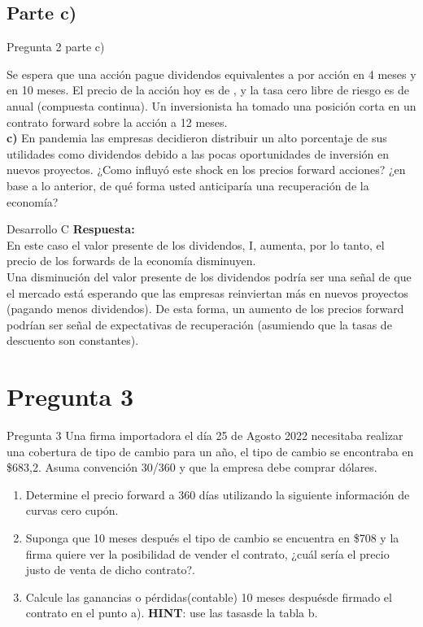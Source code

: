 \documentclass{beamer}
\begin{document}
\subsection{Parte c)}
\begin{frame}{Pregunta 2 parte c)}
  \justify

  Se espera que una acción pague dividendos equivalentes a \dinero{\dividendos} por acción en 4 meses y en 10 meses.
  El precio de la acción hoy es de \dinero{\precioacc}, y la tasa cero libre de riesgo es de \tlr anual (compuesta continua).
  Un inversionista ha tomado una posición corta en un contrato forward sobre la acción a 12 meses.\\
  \vspace{1em}
  \textbf{c)} En pandemia las empresas decidieron distribuir un alto porcentaje de sus utilidades como dividendos 
  debido a las pocas oportunidades de inversión en nuevos proyectos. ¿Como influyó este shock en los precios 
  forward acciones? ¿en base a lo anterior, de qué forma usted anticiparía una recuperación de la economía?
\end{frame}
\begin{frame}{Desarrollo C}
  \justify
  \textbf{Respuesta: }\\
  En este caso el valor presente de los dividendos, I, aumenta, por lo tanto, el precio de los forwards de la economía disminuyen.\\
  
Una disminución del valor presente de los dividendos podría ser una señal de que el mercado está esperando que las empresas reinviertan más en nuevos proyectos (pagando menos dividendos). De esta forma, un aumento de los precios forward podrían ser señal de expectativas de recuperación (asumiendo que la tasas de descuento son constantes). 

  
\end{frame}
\section{Pregunta 3}

\begin{frame}{Pregunta 3}
  Una firma importadora el día 25 de Agosto 2022 necesitaba realizar una cobertura de tipo de cambio 
para un año, el tipo de cambio se encontraba en \$683,2. Asuma convención 30/360 y que la empresa debe comprar dólares.\\
  \begin{enumerate}[label=\textbf{\alph*)}]
    \item Determine el precio forward a 360 días utilizando la siguiente información de curvas cero cupón.

    \item	Suponga que 10 meses después el tipo de cambio se encuentra en \$708 y la firma quiere ver
    la posibilidad de vender el contrato, ¿cuál sería el precio justo de venta de dicho contrato?.

    \item Calcule las ganancias o pérdidas(contable) 10 meses despuésde firmado el contrato en el 
        punto a). \textbf{HINT}: use las tasasde la tabla b.
      \end{enumerate}
\end{frame}
\end{document}
